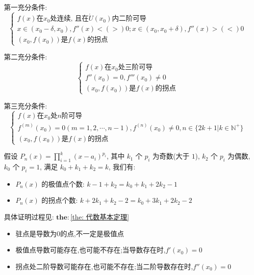 \begin{theorem}[拐点判别]
	第一充分条件:
	$$
	\begin{cases} f(x) \text{在} x_{0} \text{处连续, 且在} \mathring{U}(x_{0}) \text{内二阶可导}\\
		x\in(x_{0}-\delta,x_{0}),f''(x)<(>)0; x\in(x_{0},x_{0}+\delta),f''(x)>(<)0\\
		(x_{0},f(x_{0})) \text{是} f(x) \text{的拐点}
	\end{cases}
	$$

	第二充分条件:
	$$
	\begin{cases} f(x) \text{在} x_{0} \text{处三阶可导}\\
		f''(x_{0}) = 0, f'''(x_{0})\neq 0\\
		(x_{0},f(x_{0})) \text{是} f(x) \text{的拐点}
	\end{cases}
	$$

	第三充分条件:
	$$
	\begin{cases} f(x) \text{在} x_{0} \text{处} n \text{阶可导}\\
		f^{(m)}(x_{0}) = 0(m = 1,2,\cdots,n-1), f^{(n)}(x_{0}) \neq 0, n\in \{2k+1|k\in \mathbb{N}^{+}\}\\
		(x_{0},f(x_{0})) \text{是} f(x) \text{的拐点}
	\end{cases}
	$$
	
\end{theorem}
\begin{theorem}[多项式函数极值点和拐点个数]
	假设 $P_{n}(x)=\prod\limits_{i=1}^{k}(x-a_{i})^{p_{i}}$, 其中 $k_{1}$ 个 $p_{i}$ 为奇数(大于 $1$), $k_{2}$ 个 $p_{i}$ 为偶数, $k_{0}$ 个 $p_{i}=1$, 满足 $k_{0}+k_{1}+k_{2} = k$, 我们有:
		\begin{itemize}
			\item $P_{n}(x)$ 的极值点个数: $k-1+k_{2} = k_{0}+k_{1}+2k_{2}-1$
			\item $P_{n}(x)$ 的拐点个数: $k+2k_{1}+k_{2}-2 = k_{0}+3k_{1}+2k_{2}-2$
		\end{itemize}

		具体证明过程见: $\mathbf{the: }$\ref{the: 代数基本定理}
\end{theorem}
\begin{anymark}[注]
	\begin{itemize}
		\item 驻点是导数为$0$的点,不一定是极值点
		\item 极值点导数可能存在,也可能不存在;当导数存在时,$f'(x_{0})=0$
		\item 拐点处二阶导数可能存在,也可能不存在;当二阶导数存在时,$f''(x_{0})=0$
	\end{itemize}
\end{anymark}
